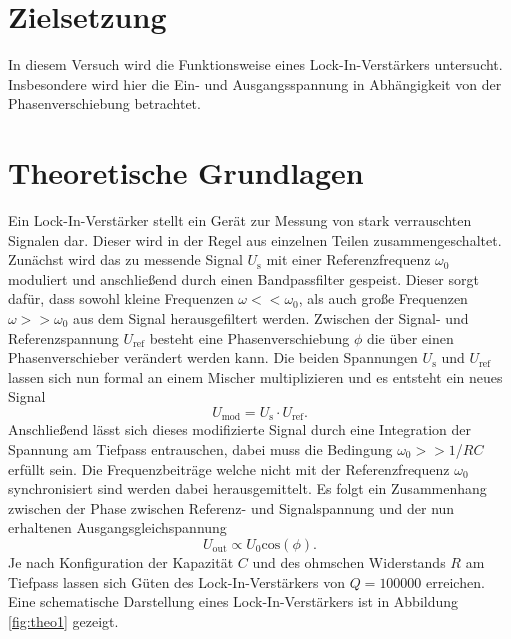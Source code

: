 \section{Zielsetzung}

In diesem Versuch wird die Funktionsweise eines Lock-In-Verstärkers untersucht. Insbesondere wird hier die Ein- und Ausgangsspannung 
in Abhängigkeit von der Phasenverschiebung betrachtet.

\section{Theoretische Grundlagen}

Ein Lock-In-Verstärker stellt ein Gerät zur Messung von stark verrauschten Signalen dar. Dieser wird in der Regel aus einzelnen Teilen zusammengeschaltet. 
\\
Zunächst wird das zu messende Signal $U_\text{s}$ mit einer Referenzfrequenz $\omega_{0}$ moduliert und anschließend durch einen Bandpassfilter gespeist. Dieser sorgt dafür, dass sowohl kleine Frequenzen $\omega << \omega_{0}$, als auch große Frequenzen $\omega >> \omega_{0}$ aus dem Signal 
herausgefiltert werden. Zwischen der Signal- und Referenzspannung $U_\text{ref}$ besteht eine Phasenverschiebung $\phi$ die über einen Phasenverschieber verändert werden kann. Die beiden Spannungen $U_\text{s}$ und $U_\text{ref}$ lassen sich nun formal an einem Mischer multiplizieren und es entsteht ein
neues Signal 
\begin{equation*}
U_{\text{mod}} = U_\text{s} \cdot U_{\text{ref}}. 
\end{equation*}
Anschließend lässt sich dieses modifizierte Signal durch eine Integration der Spannung am Tiefpass entrauschen, dabei muss die Bedingung $\omega_0 >> 1$/$RC$ erfüllt sein. Die Frequenzbeiträge welche nicht mit der Referenzfrequenz $\omega_0$ synchronisiert sind werden dabei herausgemittelt.
Es folgt ein Zusammenhang zwischen der Phase zwischen Referenz- und Signalspannung und der
nun erhaltenen Ausgangsgleichspannung
\begin{equation}
    \label{eqn:yesss}
    U_{\text{out}} \propto U_{0} \text{cos}(\phi).
\end{equation}
Je nach Konfiguration der Kapazität $C$ und des ohmschen Widerstands $R$ am Tiefpass lassen sich Güten des Lock-In-Verstärkers von $Q = 100000$ erreichen.
\\
Eine schematische Darstellung eines Lock-In-Verstärkers ist in Abbildung \ref{fig:theo1} gezeigt.

